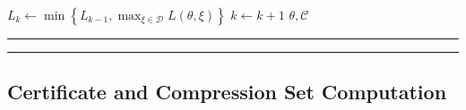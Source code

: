 \begin{figure*}
\begin{algorithmic}[1]
            \Statex \vspace{-0.35cm}\hrulefill
	    \State $L_k \gets \min\left\{ L_{k-1}, \max_{\xi \in \mathcal{D}} L(\theta,\xi)\right\}$  \label{line:update_L}
        \State $k \gets k+1$  \label{line:update_k}
            \EndWhile
            \State \Return $\theta, \mathcal{C}$
            \EndFunction
    \end{algorithmic}
               \vspace{0.1cm} \hrule \vspace{0.05cm} \hrule
\end{figure*}
\makeatletter
\renewcommand{\fnum@figure}{Fig. \thefigure}
\makeatother

\setcounter{algorithm}{1}


\subsection{Certificate and Compression Set Computation}

